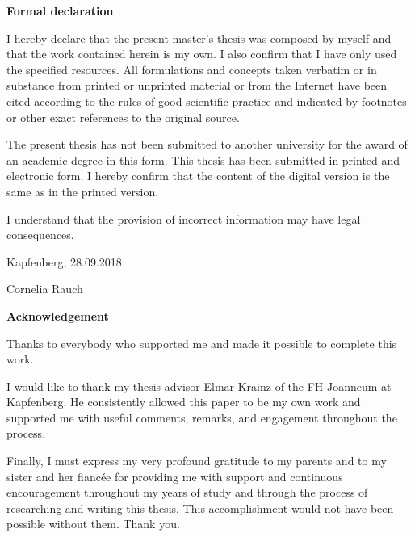 
\chapterend

\begin{titlepage}


\begin{center}\large\bf
Formal declaration
\end{center}


I hereby declare that the present master's thesis was composed by myself and that the work contained herein is my own. I also confirm that I have only used the specified resources. All formulations and concepts taken verbatim or in substance from printed or unprinted material or from the Internet have been cited according to the rules of good scientific practice and indicated by footnotes or other exact references to the original source. 

The present thesis has not been submitted to another university for the award of an academic degree in this form. This thesis has been submitted in printed and electronic form. I hereby confirm that the content of the digital version is the same as in the printed version.

I understand that the provision of incorrect information may have legal consequences.

\vspace{1,5cm}
Kapfenberg, 28.09.2018

\flushright
\vspace{15mm}
Cornelia Rauch

\end{titlepage}



\chapterend

\begin{titlepage}

\begin{center}\large\bf
Acknowledgement
\end{center}
Thanks to everybody who supported me and made it possible to complete this work.

I would like to thank my thesis advisor Elmar Krainz of the FH Joanneum at Kapfenberg. He consistently allowed this paper to be my own work and supported me with useful comments, remarks, and engagement throughout the process. 

Finally, I must express my very profound gratitude to my parents and to my sister and her fiancée for providing me with support and continuous encouragement throughout my years of study and through the process of researching and writing this thesis. This accomplishment would not have been possible without them. Thank you.

\end{titlepage}



\chapterend
